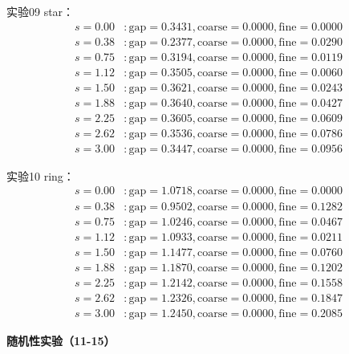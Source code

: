 \documentclass[11pt,a4paper]{book}
\theoremstyle{definition}
\begin{document}
实验09 star：
\begin{align*}
s=0.00 &: \text{gap}=0.3431, \text{coarse}=0.0000, \text{fine}=0.0000 \\
s=0.38 &: \text{gap}=0.2377, \text{coarse}=0.0000, \text{fine}=0.0290 \\
s=0.75 &: \text{gap}=0.3194, \text{coarse}=0.0000, \text{fine}=0.0119 \\
s=1.12 &: \text{gap}=0.3505, \text{coarse}=0.0000, \text{fine}=0.0060 \\
s=1.50 &: \text{gap}=0.3621, \text{coarse}=0.0000, \text{fine}=0.0243 \\
s=1.88 &: \text{gap}=0.3640, \text{coarse}=0.0000, \text{fine}=0.0427 \\
s=2.25 &: \text{gap}=0.3605, \text{coarse}=0.0000, \text{fine}=0.0609 \\
s=2.62 &: \text{gap}=0.3536, \text{coarse}=0.0000, \text{fine}=0.0786 \\
s=3.00 &: \text{gap}=0.3447, \text{coarse}=0.0000, \text{fine}=0.0956
\end{align*}

实验10 ring：
\begin{align*}
s=0.00 &: \text{gap}=1.0718, \text{coarse}=0.0000, \text{fine}=0.0000 \\
s=0.38 &: \text{gap}=0.9502, \text{coarse}=0.0000, \text{fine}=0.1282 \\
s=0.75 &: \text{gap}=1.0246, \text{coarse}=0.0000, \text{fine}=0.0467 \\
s=1.12 &: \text{gap}=1.0933, \text{coarse}=0.0000, \text{fine}=0.0211 \\
s=1.50 &: \text{gap}=1.1477, \text{coarse}=0.0000, \text{fine}=0.0760 \\
s=1.88 &: \text{gap}=1.1870, \text{coarse}=0.0000, \text{fine}=0.1202 \\
s=2.25 &: \text{gap}=1.2142, \text{coarse}=0.0000, \text{fine}=0.1558 \\
s=2.62 &: \text{gap}=1.2326, \text{coarse}=0.0000, \text{fine}=0.1847 \\
s=3.00 &: \text{gap}=1.2450, \text{coarse}=0.0000, \text{fine}=0.2085
\end{align*}

\textbf{随机性实验（11-15）}
\end{document}

